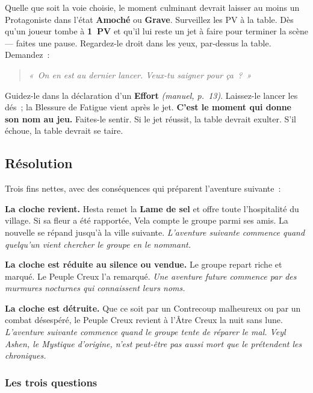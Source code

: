 \documentclass[10pt,a4paper]{article}
\begin{document}
Quelle que soit la voie choisie, le moment culminant devrait laisser au moins un Protagoniste dans l’état \textbf{Amoché} ou \textbf{Grave}. Surveillez les PV à la table. Dès qu’un joueur tombe à \textbf{1~PV} et qu’il lui reste un jet à faire pour terminer la scène --- faites une pause. Regardez-le droit dans les yeux, par-dessus la table. Demandez~:

\begin{quote}
\emph{«~On en est au dernier lancer. Veux-tu saigner pour ça~?~»}
\end{quote}

Guidez-le dans la déclaration d’un \textbf{Effort} \emph{(manuel, p.~13)}. Laissez-le lancer les dés~; la Blessure de Fatigue vient après le jet. \textbf{C’est le moment qui donne son nom au jeu.} Faites-le sentir. Si le jet réussit, la table devrait exulter. S’il échoue, la table devrait se taire.

\par\vspace{3pt}

\subsection{Résolution}\label{ruxe9solution}

Trois fins nettes, avec des conséquences qui préparent l’aventure suivante~:

\textbf{La cloche revient.} Hesta remet la \textbf{Lame de sel} et offre toute l’hospitalité du village. Si sa fleur a été rapportée, Vela compte le groupe parmi ses amis. La nouvelle se répand jusqu’à la ville suivante. \emph{L’aventure suivante commence quand quelqu’un vient chercher le groupe en le nommant.}

\textbf{La cloche est réduite au silence ou vendue.} Le groupe repart riche et marqué. Le Peuple Creux l’a remarqué. \emph{Une aventure future commence par des murmures nocturnes qui connaissent leurs noms.}

\textbf{La cloche est détruite.} Que ce soit par un Contrecoup malheureux ou par un combat désespéré, le Peuple Creux revient à l’Âtre Creux la nuit sans lune. \emph{L’aventure suivante commence quand le groupe tente de réparer le mal. Veyl Ashen, le Mystique d’origine, n’est peut-être pas aussi mort que le prétendent les chroniques.}

\subsubsection{Les trois questions}\label{les-trois-questions}
\end{document}
